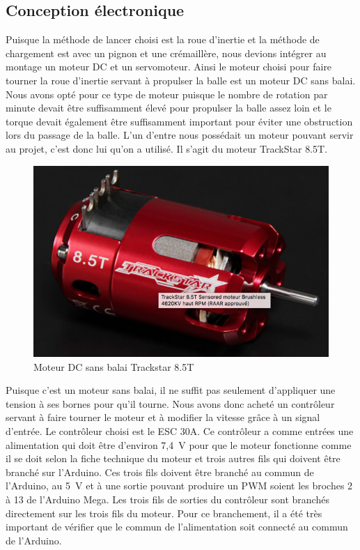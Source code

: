 \subsection{Conception électronique}

Puisque la méthode de lancer choisi est la roue d’inertie et la méthode de chargement est avec un pignon et une crémaillère, nous devions intégrer au montage un moteur DC et un servomoteur.
Ainsi le moteur choisi pour faire tourner la roue d’inertie servant à propulser la balle est un moteur DC sans balai.
Nous avons opté pour ce type de moteur puisque le nombre de rotation par minute devait être suffisamment élevé pour propulser la balle assez loin et le torque devait également être suffisamment important pour éviter une obstruction lors du passage de la balle.
L’un d’entre nous possédait un moteur pouvant servir au projet, c’est donc lui qu’on a utilisé.
Il s’agit du moteur TrackStar 8.5T.

\begin{figure}[h!]
    \centering
    \includegraphics[width=0.4\linewidth]{img/s2/elec/moteurDCsansbalai}
    \caption{Moteur DC sans balai Trackstar 8.5T}
    \label{fig:s2-elec-moteurDCsansbalai}
\end{figure}

Puisque c’est un moteur sans balai, il ne suffit pas seulement d’appliquer une tension à ses bornes pour qu’il tourne.
Nous avons donc acheté un contrôleur servant à faire tourner le moteur et à modifier la vitesse grâce à un signal d'entrée.
Le contrôleur choisi est le ESC 30A.
Ce contrôleur a comme entrées une alimentation qui doit être d’environ 7,4~V pour que le moteur fonctionne comme il se doit selon la fiche technique du moteur \cite{noauthor_trackstar_nodate} et trois autres fils qui doivent être branché sur l’Arduino.
Ces trois fils doivent être branché au commun de l’Arduino, au 5~V et à une sortie pouvant produire un PWM soient les broches 2 à 13 de l’Arduino Mega.
Les trois fils de sorties du contrôleur sont branchés directement sur les trois fils du moteur.
Pour ce branchement, il a été très important de vérifier que le commun de l’alimentation soit connecté au commun de l’Arduino.

